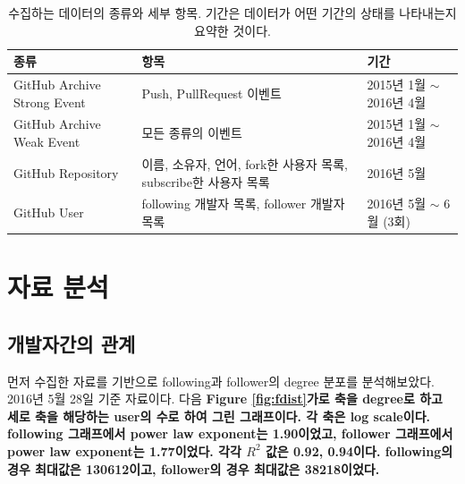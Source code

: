 \documentclass[10pt, a4paper, titlepage]{article}
\begin{document}
\begin{table}[ht]
\begin{tabular}{|m{2.5cm}|m{4cm}|m{4.0cm}|}

\hline
\rowcolor[gray]{0.8}
종류 & 항목 & 기간 \\

\hline

GitHub Archive Strong Event &
Push, PullRequest 이벤트 &
2015년 1월 $\sim$ 2016년 4월 \\

\hline

GitHub Archive Weak Event &
모든 종류의 이벤트&
2015년 1월 $\sim$ 2016년 4월 \\

\hline

GitHub Repository &
이름, 소유자, 언어, fork한 사용자 목록, subscribe한 사용자 목록 &
2016년 5월 \\

\hline

GitHub User &
following 개발자 목록,
follower 개발자 목록 &
2016년 5월 $\sim$ 6월 (3회)\\

\hline
\end{tabular} 

\caption{
	수집하는 데이터의 종류와 세부 항목. 기간은 데이터가 어떤 기간의 상태를 나타내는지 요약한 것이다.
}
\label{tab:collect}
\end{table}


\section{자료 분석}
\subsection{개발자간의 관계}
먼저 수집한 자료를 기반으로 following과 follower의 degree 분포를 분석해보았다. 2016년 5월 28일 기준 자료이다. 다음 \bf{Figure} \ref{fig:fdist} 가로 축을 degree로 하고 세로 축을 해당하는 user의 수로 하여 그린 그래프이다. 각 축은 log scale이다. following 그래프에서 power law exponent는 1.90이었고, follower 그래프에서 power law exponent는 1.77이었다. 각각 $R^2$ 값은 0.92, 0.94이다. following의 경우 최대값은 130612이고, follower의 경우 최대값은 38218이었다.
\end{document}

